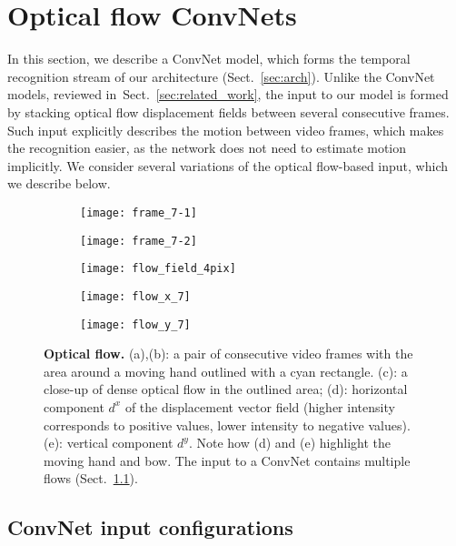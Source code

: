 \documentclass{article} \usepackage{nips14submit_e,times}
\newcommand{\sref}[1]{Sect.~\ref{#1}}
\begin{document}
\section{Optical flow ConvNets}
\label{sec:temp_net}
In this section, we describe a ConvNet model, which forms the temporal recognition stream of our architecture (\sref{sec:arch}).
Unlike the ConvNet models, reviewed in~\sref{sec:related_work}, the input to our model is formed by stacking optical flow displacement fields
between several consecutive frames. Such input explicitly describes the motion between video frames, which makes the recognition easier, as the network does 
not need to estimate motion implicitly. We consider several variations of the optical flow-based input, which we describe below. 
\begin{figure}[ht]
\centering
\begin{subfigure}[b]{0.19\textwidth}
\texttt{[image: frame\_7-1]}
\caption{}
\end{subfigure}
\begin{subfigure}[b]{0.19\textwidth}
\texttt{[image: frame\_7-2]}
\caption{}
\end{subfigure}
\begin{subfigure}[b]{0.19\textwidth}
\texttt{[image: flow\_field\_4pix]}
\caption{}
\end{subfigure}
\begin{subfigure}[b]{0.19\textwidth}
\texttt{[image: flow\_x\_7]}
\caption{}
\end{subfigure}
\begin{subfigure}[b]{0.19\textwidth}
\texttt{[image: flow\_y\_7]}
\caption{}
\end{subfigure}
\caption{\textbf{Optical flow.} 
(a),(b): a pair of consecutive video frames with the area around a moving hand outlined with a cyan rectangle.
(c): a close-up of dense optical flow in the outlined area; 
(d): horizontal component $d^x$ of the displacement vector field (higher intensity corresponds to positive values, lower intensity to negative values).
(e): vertical component $d^y$.
Note how (d) and (e) highlight the moving hand and bow. The input to a ConvNet contains multiple flows (\sref{sec:temp_net_input}).
}
\label{fig:flow_vis}
\end{figure}


\subsection{ConvNet input configurations}
\label{sec:temp_net_input}
\end{document}
